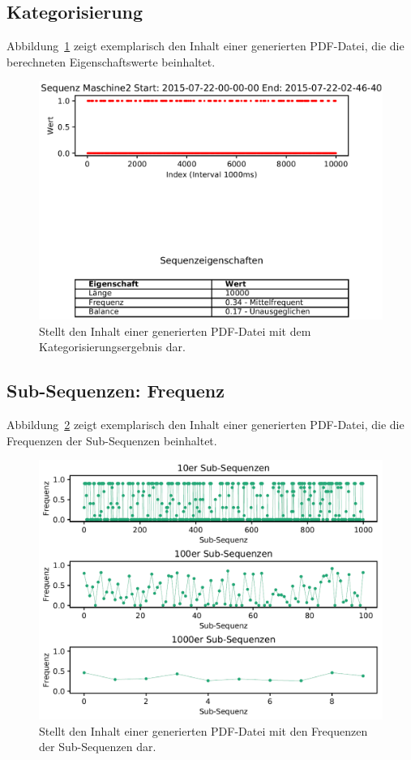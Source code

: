 \subsection{Kategorisierung}
Abbildung~\ref{fig:result:categorization} zeigt exemplarisch den Inhalt einer generierten PDF-Datei, die die berechneten Eigenschaftswerte beinhaltet.
\begin{figure}[H]
	\includegraphics[width=\linewidth]{attachements/python/categorization.PNG}
	\caption[Anhang: Ergebnis der Kategorisierung]{Stellt den Inhalt einer generierten PDF-Datei mit dem Kategorisierungsergebnis dar\footnotemark.}
	\label{fig:result:categorization}
\end{figure}

\newpage
\subsection{Sub-Sequenzen: Frequenz}
Abbildung~\ref{fig:result:sub:freq} zeigt exemplarisch den Inhalt einer generierten PDF-Datei, die die Frequenzen der Sub-Sequenzen beinhaltet.
\begin{figure}[H]
	\includegraphics[width=\linewidth]{attachements/python/frequency.PNG}
	\caption[Anhang: Frequenz der Sub-Sequenzen]{Stellt den Inhalt einer generierten PDF-Datei mit den Frequenzen der Sub-Sequenzen dar\footnotemark.}
	\label{fig:result:sub:freq}
\end{figure}

